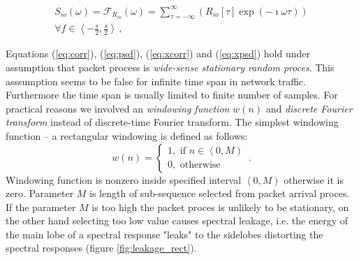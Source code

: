 \begin{equation}\label{eq:xpsd}
\begin{split}
S_{io}(\omega) = \mathcal{F}_{R_{io}}\left(\omega\right) = \sum_{\tau=-\infty}^{\infty} 
\left( R_{io}\left[\tau\right] \exp\left( -\imath \omega\tau \right)\right) \\ 
\forall f \in \left\langle -\frac{s}{2},\frac{s}{2} \right\rangle\, , 
\end{split}
\end{equation}

Equations (\ref{eq:corr}), (\ref{eq:psd}), (\ref{eq:xcorr}) and (\ref{eq:xpsd}) 
hold under assumption that packet process is \emph{wide-sense stationary random proces}.
This asssumption seems to be false for infinite time span in network traffic.
Furthermore the time span is usually limited to finite number of samples.
For practical reasons we involved an \emph{windowing function} $w(n)$ and 
\emph{discrete Fourier transform} instead of discrete-time Fourier transform. 
The simplest windowing function -- a rectangular windowing is defined as follows:
\begin{equation}
w(n) = \left\lbrace \begin{array}{l} 
1, \mbox{ if } n\in \left\langle 0, M \right) \\ 
0, \mbox{ otherwise} \end{array}\right. \,.
\end{equation}
Windowing function is nonzero inside specified interval $\left\langle 0, M \right)$ 
otherwise it is zero. 
Parameter  $M$ is length of sub-sequence selected from packet arrival proces. 
If the parameter $M$ is too high the packet proces is unlikely to be stationary, 
on the other hand selecting too low value causes spectral leakage, i.e. the energy 
of the main lobe of a spectral response "leaks" to the sidelobes distorting the 
spectral responses \cite{kay1981spectrum} (figure \ref{fig:leakage_rect}). 

